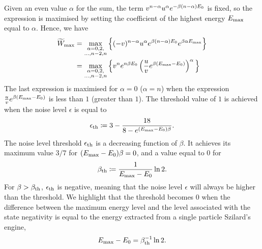 \documentclass[pra,
aps,
twocolumn,
superscriptaddress,
groupedaddress,
nofootinbib,
reprint
]{revtex4-1}
\begin{document}
Given an even value $\alpha$ for the sum, the term $v^{n-\alpha} u^{\alpha} e^{-\beta (n-\alpha)E_0}$ is fixed, so the expression is maximised by setting the coefficient of the highest energy $E_{\rm{max}}$ equal to $\alpha$.
Hence, we have
\begin{align}
	\widetilde{W}_{\rm{max}} &= \max\limits_{\substack{\alpha = 0,2, \\ \dots,n-2,n}}{\Big\{ (-v)^{n-\alpha} u^{\alpha} e^{\beta (n-\alpha)E_0} e^{\beta \alpha E_{\rm{max}}} \Big\}} \\
	&= \max\limits_{\substack{\alpha = 0,2, \\ \dots,n-2,n}}{\Big\{ v^n e^{n\beta E_0} \left( \frac{u}{v} e^{\beta (E_{\rm{max}} - E_0)} \right)^{\alpha} \Big\}}
\end{align}
The last expression is maximised for $\alpha = 0$ ($\alpha = n$) when the expression $\frac{u}{v} e^{\beta (E_{\rm{max}} - E_0)}$ is less than $1$ (greater than $1$).
The threshold value of $1$ is achieved when the noise level $\epsilon$ is equal to
\begin{equation}
	\epsilon_{\rm{th}} \coloneqq 3 - \dfrac{18}{8-e^{(E_{\rm{max}} - E_0)\beta}}.
\end{equation}
The noise level threshold $\epsilon_{\rm{th}}$ is a decreasing function of $\beta$.
It achieves its maximum value $3/7$ for $(E_{\rm{max}} - E_0)\beta = 0$, and a value equal to $0$ for
\begin{equation}
	\beta_{\rm{th}} \coloneqq \frac{1}{E_{\rm{max}} - E_0} \ln2.
\end{equation}
For $\beta > \beta_{\rm{th}}$, $\epsilon_{\rm{th}}$ is negative, meaning that the noise level $\epsilon$ will always be higher than the threshold.
We highlight that the threshold becomes $0$ when the difference between the maximum energy level and the level associated with the state negativity is equal to the energy extracted from a single particle Szilard's engine,
\begin{equation}
	E_{\rm{max}} - E_0 = \beta_{\rm{th}}^{-1} \ln2.
\end{equation}
\end{document}
